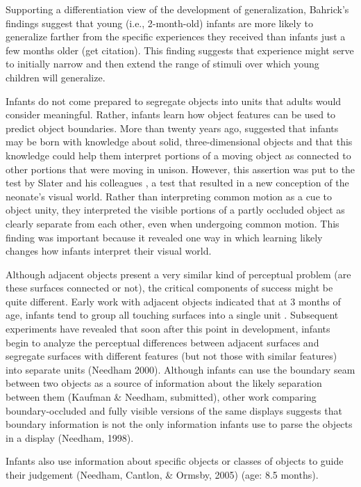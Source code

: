 Supporting a differentiation view of the development of
generalization, Bahrick's findings suggest that young (i.e.,
2-month-old) infants are more likely to generalize farther from the
specific experiences they received than infants just a few months
older (get citation).  This finding suggests that experience might
serve to initially narrow and then extend the range of stimuli over
which young children will generalize.


Infants do not come prepared to segregate objects into units that
adults would consider meaningful.  Rather, infants learn how object
features can be used to predict object boundaries.  More than twenty
years ago,  suggested that infants may be born
with knowledge about solid, three-dimensional objects and that this
knowledge could help them interpret portions of a moving object as
connected to other portions that were moving in unison.  However, this
assertion was put to the test by Slater and his colleagues 
\cite{slater90newborn}, a test that resulted in a new conception of
the neonate's visual world.  Rather than interpreting common motion as
a cue to object unity, they interpreted the visible portions of a
partly occluded object as clearly separate from each other, even when
undergoing common motion.  This finding was important because it
revealed one way in which learning likely changes how infants
interpret their visual world.


Although adjacent objects present a very similar kind of perceptual
problem (are these surfaces connected or not), the critical components
of success might be quite different.  Early work with adjacent objects
indicated that at 3 months of age, infants tend to group all touching
surfaces into a single unit \cite{kestenbaum87perception}.
Subsequent experiments have revealed that soon after this point in
development, infants begin to analyze the perceptual differences
between adjacent surfaces and segregate surfaces with different
features (but not those with similar features) into separate units
(Needham 2000).  Although infants can use the boundary seam between
two objects as a source of information about the likely separation
between them (Kaufman \& Needham, submitted), other work comparing
boundary-occluded and fully visible versions of the same displays
suggests that boundary information is not the only information infants
use to parse the objects in a display (Needham, 1998).  

Infants also use information about specific objects or
classes of objects to guide their judgement (Needham, Cantlon, \& Ormsby, 2005) (age: 8.5 months).



